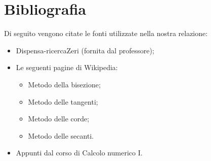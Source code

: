 \documentclass[a4paper,12pt,]{article}
\begin{document}
\section {Bibliografia}
Di seguito vengono citate le fonti utilizzate nella nostra relazione:
	\begin{itemize}
	\item Dispensa-ricercaZeri (fornita dal professore);
	\item Le seguenti pagine di Wikipedia:
		\begin{itemize}
		\item Metodo della bisezione;
		\item Metodo delle tangenti;
		\item Metodo delle corde;
		\item Metodo delle secanti.
		\end{itemize}
	\item Appunti dal corso di Calcolo numerico I.
	\end{itemize}
\end{document}
